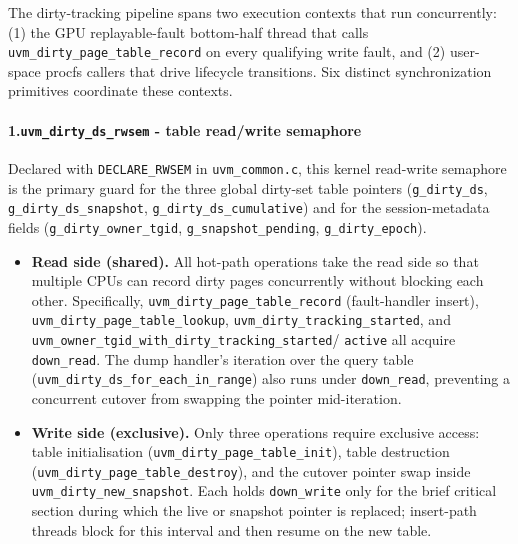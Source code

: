
The dirty-tracking pipeline spans two execution contexts that run
concurrently: (1) the GPU replayable-fault bottom-half thread that calls
\texttt{uvm\_dirty\_page\_table\_record} on every qualifying write fault, and
(2) user-space procfs callers that drive lifecycle transitions.
Six distinct synchronization primitives coordinate these contexts.

\paragraph{1.\enspace\texttt{uvm\_dirty\_ds\_rwsem} - table read/write semaphore}

Declared with \texttt{DECLARE\_RWSEM} in \texttt{uvm\_common.c}, this
kernel read-write semaphore is the primary guard for the three global dirty-set
table pointers (\texttt{g\_dirty\_ds}, \texttt{g\_dirty\_ds\_snapshot},
\texttt{g\_dirty\_ds\_cumulative}) and for the session-metadata fields
(\texttt{g\_dirty\_owner\_tgid}, \texttt{g\_snapshot\_pending},
\texttt{g\_dirty\_epoch}).

\begin{itemize}
    \item \textbf{Read side (shared).}
          All hot-path operations take the read side so that multiple CPUs can
          record dirty pages concurrently without blocking each other.
          Specifically, \texttt{uvm\_dirty\_page\_table\_record} (fault-handler
          insert), \texttt{uvm\_dirty\_page\_table\_lookup},
          \texttt{uvm\_dirty\_tracking\_started}, and
          \texttt{uvm\_owner\_tgid\_with\_dirty\_tracking\_started}/
          \texttt{active} all acquire \texttt{down\_read}.
          The dump handler's iteration over the query table
          (\texttt{uvm\_dirty\_ds\_for\_each\_in\_range}) also runs under
          \texttt{down\_read}, preventing a concurrent cutover from swapping
          the pointer mid-iteration.

    \item \textbf{Write side (exclusive).}
          Only three operations require exclusive access: table
          initialisation (\texttt{uvm\_dirty\_page\_table\_init}), table
          destruction (\texttt{uvm\_dirty\_page\_table\_destroy}), and the
          cutover pointer swap inside \texttt{uvm\_dirty\_new\_snapshot}.
          Each holds \texttt{down\_write} only for the brief critical section
          during which the live or snapshot pointer is replaced; insert-path
          threads block for this interval and then resume on the new table.
\end{itemize}

